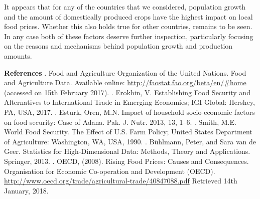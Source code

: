 \documentclass[11pt]{article}
\begin{document}
It appears that for any of the countries that we considered, population growth and the amount of domestically produced crops have the highest impact on local food prices. Whether this also holds true for other countries, remains to be seen. In any case both of these factors deserve further inspection, particularly focusing on the reasons and mechanisms behind population growth and production amounts.




\newpage
\textbf{References} \hfill \break
\hfill \break
[1]. Food and Agriculture Organization of the United Nations. Food and Agriculture
Data. Available online: \url{http://faostat.fao.org/beta/en/#home} (accessed on 15th February 2017). \hfill \break
\hfill \break
[2]. Erokhin, V. Establishing Food Security and Alternatives to International Trade in
Emerging Economies; IGI Global: Hershey, PA, USA, 2017. \hfill \break
\hfill \break
[3] . Esturk, Oren, M.N. Impact of household socio-economic factors on food security: Case of Adana. Pak. J. Nutr. 2013, 13, 1–6. \hfill \break
\hfill \break
[4]. Smith, M.E. World Food Security. The Effect of U.S. Farm Policy; 
United States Department of Agriculture: Washington, WA, USA, 1990.  \hfill \break
\hfill \break
[5]. Bühlmann, Peter, and Sara van de Geer. Statistics for High-Dimensional Data: Methods, Theory and Applications. Springer, 2013. \hfill \break
\hfill \break
[6]. OECD, (2008). Rising Food Prices: Causes and Consequences. Organisation for Economic Co-operation and Development (OECD). \url{http://www.oecd.org/trade/agricultural-trade/40847088.pdf} Retrieved 14th January, 2018.



%
%
\newpage 
\end{document}

